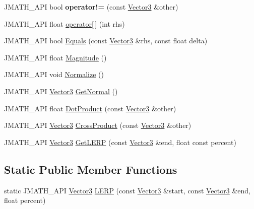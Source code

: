 \begin{DoxyCompactItemize}
\item 
\hypertarget{class_vector3_a618208f396f28328642826f06fcab560}{J\+M\+A\+T\+H\+\_\+\+A\+P\+I bool {\bfseries operator!=} (const \hyperlink{class_vector3}{Vector3} \&other)}\label{class_vector3_a618208f396f28328642826f06fcab560}

\item 
J\+M\+A\+T\+H\+\_\+\+A\+P\+I float \hyperlink{class_vector3_a3bf45930f4dfe947be7e19114194449b}{operator\mbox{[}$\,$\mbox{]}} (int rhs)
\item 
J\+M\+A\+T\+H\+\_\+\+A\+P\+I bool \hyperlink{class_vector3_a8fcd591601f7a03708076a2742b562d7}{Equals} (const \hyperlink{class_vector3}{Vector3} \&rhs, const float delta)
\item 
J\+M\+A\+T\+H\+\_\+\+A\+P\+I float \hyperlink{class_vector3_a5721d97b9640951b58c40de1a893f966}{Magnitude} ()
\item 
J\+M\+A\+T\+H\+\_\+\+A\+P\+I void \hyperlink{class_vector3_a9c94cc16049543fc8edaba52c2b266b7}{Normalize} ()
\item 
J\+M\+A\+T\+H\+\_\+\+A\+P\+I \hyperlink{class_vector3}{Vector3} \hyperlink{class_vector3_aac4b7fb86655981ba92782fca425ea89}{Get\+Normal} ()
\item 
J\+M\+A\+T\+H\+\_\+\+A\+P\+I float \hyperlink{class_vector3_a8416185c1c6c146d5785f423a6fdac79}{Dot\+Product} (const \hyperlink{class_vector3}{Vector3} \&other)
\item 
J\+M\+A\+T\+H\+\_\+\+A\+P\+I \hyperlink{class_vector3}{Vector3} \hyperlink{class_vector3_a38c24d4aa23a9c74402411b1cbb256de}{Cross\+Product} (const \hyperlink{class_vector3}{Vector3} \&other)
\item 
J\+M\+A\+T\+H\+\_\+\+A\+P\+I \hyperlink{class_vector3}{Vector3} \hyperlink{class_vector3_a6375172d87639d0b43e25bcc90a23760}{Get\+L\+E\+R\+P} (const \hyperlink{class_vector3}{Vector3} \&end, float const percent)
\end{DoxyCompactItemize}
\subsection*{Static Public Member Functions}
\begin{DoxyCompactItemize}
\item 
static J\+M\+A\+T\+H\+\_\+\+A\+P\+I \hyperlink{class_vector3}{Vector3} \hyperlink{class_vector3_a377ba80f6eae03272feae160a77a9f14}{L\+E\+R\+P} (const \hyperlink{class_vector3}{Vector3} \&start, const \hyperlink{class_vector3}{Vector3} \&end, float percent)
\end{DoxyCompactItemize}
